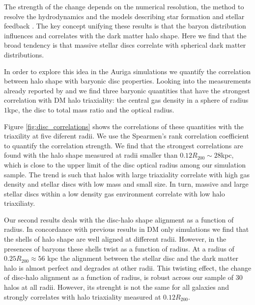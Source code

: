 \documentclass[usenatbib]{mnras}
\begin{document}
The strength of the change depends on the numerical resolution, the
method to resolve the hydrodynamics and the models describing star
formation and stellar feedback \citep{Debattista08, Bryan13, Butsky16,
  Chua19, Artale19}.  
The key concept unifying these results is that the baryon distribution
influences and correlates with the dark matter halo shape. 
Here we find that the broad tendency is that massive stellar discs
correlate with spherical dark matter distributions. 

In order to explore this idea in the Auriga simulations we quantify
the correlation between halo shape with baryonic disc properties. 
Looking into the measurements already reported by \cite{auriga} and
\cite{Pakmor17} we find three baryonic quantities that have the
strongest correlation with DM halo triaxiality: the central gas
density in a sphere of radius $1$kpc, the disc to total mass ratio and
the optical radius.

Figure \ref{fig:disc_correlations} shows the correlations of
these quantities with the triaxility at five diferent radii.
We use the Spearmen's rank correlation coefficient to quantify the
correlation strength.
We find that the strongest correlations are found with the halo shape
measured at radii smaller than $0.12R_{200}\sim 28$kpc, which 
is close to the upper limit of the disc optical radius among our
simulation sample. 
The trend is such that halos with large triaxiality correlate with
high gas density and stellar discs with low mass and small size.
In turn, massive and large stellar discs within a low density gas
environment correlate with low halo triaxiliaty. 

Our second results deals with the disc-halo shape alignment as a function of
radius. 
In concordance with previous results in DM only simulations we find
that the shells of halo shape are well aligned at different radii.
However, in the presences of baryons these shells twist as a function
of radius.
At a radius of $0.25R_{200}\approx 56$ kpc the alignment between the
stellar disc and the dark matter halo is almost perfect and degrades
at other radii. 
This twisting effect, the change of disc-halo alignment as
a function of radius, is robust across our sample of 30
halos at all radii.
However, its strenght is not the same for all galaxies and strongly
correlates with halo triaxiality measured at $0.12R_{200}$. 
\end{document}
